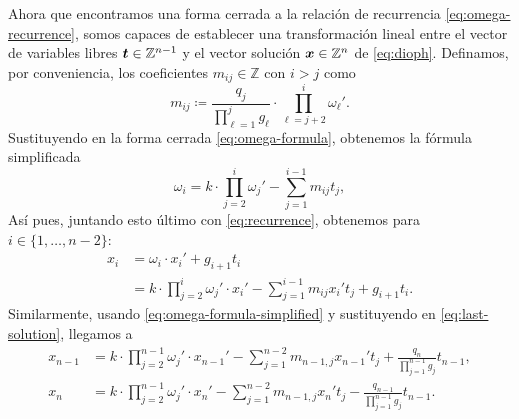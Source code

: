 Ahora que encontramos una forma cerrada a la relación de recurrencia \eqref{eq:omega-recurrence},
somos capaces de establecer una transformación lineal entre el vector de variables libres $\boldsymbol{t}
\in \mathbb{Z}^{n-1}$ y el vector solución $\boldsymbol{x} \in \mathbb{Z}^{n}$ de \eqref{eq:dioph}. Definamos, por
conveniencia, los coeficientes $m_{ij} \in \mathbb{Z}$ con $i > j$ como
\begin{equation}
	\label{phase-2:eq:coeffs}
	m_{ij} \coloneq \frac{q_j}{\prod_{\ell = 1}^{j}g_\ell} \cdot \prod_{\ell = j +
	2}^{i}\omega_\ell'.
\end{equation}
Sustituyendo en la forma cerrada \eqref{eq:omega-formula}, obtenemos la fórmula simplificada
\begin{equation}
	\label{eq:omega-formula-simplified}
	\omega_i =
	k \cdot \prod_{j=2}^{i} \omega_j'
	- \sum_{j=1}^{i - 1}m_{ij}t_j,
\end{equation}
Así pues, juntando esto último con \eqref{eq:recurrence}, obtenemos para $i \in \{1, \ldots, n -
2\}$: 
\begin{align}
	x_i &= \omega_i \cdot x_i' + g_{i + 1}t_i \nonumber \\
		&= k \cdot \prod_{j=2}^{i}\omega_j' \cdot x_i' - \sum_{j=1}^{i - 1}m_{ij}x_i'
		t_j + g_{i + 1}t_i \label{eq:x:i}.
\end{align}
Similarmente, usando \eqref{eq:omega-formula-simplified} y sustituyendo en \eqref{eq:last-solution},
llegamos a
\begin{subequations}
	\label{eq:x:last}
	\begin{align}
		x_{n-1} &= k \cdot \prod_{j=2}^{n-1} \omega_j' \cdot x_{n-1}' - \sum_{j=1}^{n-2}
		m_{n-1,j}x_{n-1}' t_j + \frac{q_n}{\prod_{j=1}^{n-1}g_j} t_{n-1}, \\
		x_{n} &= k \cdot \prod_{j=2}^{n-1} \omega_j' \cdot x_{n}' - \sum_{j=1}^{n-2}
		m_{n-1,j}x_{n}' t_j - \frac{q_{n - 1}}{\prod_{j=1}^{n-1}g_j} t_{n-1}.
	\end{align}
\end{subequations}

